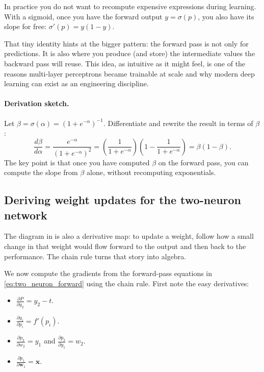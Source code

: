 \begin{tcolorbox}[summarybox, title={Author's note: the derivative is already in the forward pass}]
In practice you do not want to recompute expensive expressions during learning. With a sigmoid, once you have the forward output \(y=\sigma(p)\), you also have its slope for free: \(\sigma'(p)=y(1-y)\).

That tiny identity hints at the bigger pattern: the forward pass is not only for predictions. It is also where you produce (and store) the intermediate values the backward pass will reuse. This idea, as intuitive as it might feel, is one of the reasons multi-layer perceptrons became trainable at scale and why modern deep learning can exist as an engineering discipline.
\end{tcolorbox}

\paragraph{Derivation sketch.}
Let \(\beta=\sigma(\alpha)=(1+e^{-\alpha})^{-1}\). Differentiate and rewrite the result in terms of \(\beta\):
\[
\frac{d\beta}{d\alpha} = \frac{e^{-\alpha}}{(1+e^{-\alpha})^2}
= \left(\frac{1}{1+e^{-\alpha}}\right)\left(1-\frac{1}{1+e^{-\alpha}}\right)
 = \beta(1-\beta).
\]
The key point is that once you have computed \(\beta\) on the forward pass, you can compute the slope from \(\beta\) alone, without recomputing exponentials.

\subsection{Deriving weight updates for the two\hyp{}neuron network}
\label{sec:mlp_deriving_weight_updates_for_the_two_neuron_network}

The diagram in  is also a derivative map: to update a weight, follow how a small change in that weight would flow forward to the output and then back to the performance. The chain rule turns that story into algebra.

We now compute the gradients from the forward-pass equations in \eqref{eq:two_neuron_forward} using the chain rule. First note the easy derivatives:
\begin{itemize}
    \item $\displaystyle \frac{\partial P}{\partial y_2} = y_2 - t$.
    \item $\displaystyle \frac{\partial y_i}{\partial p_i} = f'(p_i)$.
    \item $\displaystyle \frac{\partial p_2}{\partial w_2} = y_1$ and $\displaystyle \frac{\partial p_2}{\partial y_1} = w_2$.
    \item $\displaystyle \frac{\partial p_1}{\partial \mathbf{w}_1} = \mathbf{x}$.
\end{itemize}

